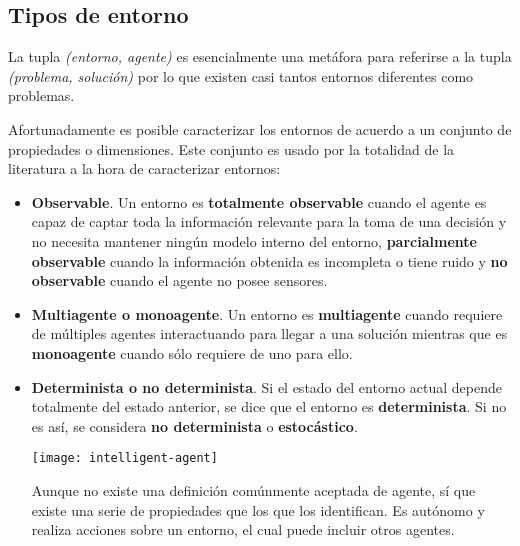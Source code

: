 \subsection{Tipos de entorno}

La tupla \textit{(entorno, agente)} es esencialmente una metáfora para referirse a la tupla \textit{(problema, solución)} por lo que existen casi tantos entornos diferentes como problemas.

Afortunadamente es posible caracterizar los entornos de acuerdo a un conjunto de propiedades o dimensiones. Este conjunto es usado por la totalidad de la literatura a la hora de caracterizar entornos:

\begin{itemize}
	\item \textbf{Observable}. Un entorno es \textbf{totalmente observable} cuando el agente es capaz de captar toda la información relevante para la toma de una decisión y no necesita mantener ningún modelo interno del entorno, \textbf{parcialmente observable} cuando la información obtenida es incompleta o tiene ruido y \textbf{no observable} cuando el agente no posee sensores.
	\item \textbf{Multiagente o monoagente}. Un entorno es \textbf{multiagente} cuando requiere de múltiples agentes interactuando para llegar a una solución mientras que es \textbf{monoagente} cuando sólo requiere de uno para ello.
	\item \textbf{Determinista o no determinista}. Si el estado del entorno actual depende totalmente del estado anterior, se dice que el entorno es \textbf{determinista}. Si no es así, se considera \textbf{no determinista} o \textbf{estocástico}.

\begin{marginfigure}
	\texttt{[image: intelligent-agent]}
	\caption[Esquema general de un agente]{Aunque no existe una definición comúnmente aceptada de agente, sí que existe una serie de propiedades que los que los identifican. Es autónomo y realiza acciones sobre un entorno, el cual puede incluir otros agentes.}
	\label{fig:intelligent-agent}


\end{marginfigure}
\end{itemize}
